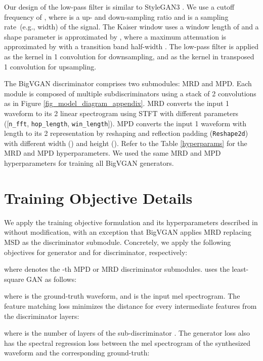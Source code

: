 \documentclass{article} \usepackage{iclr2023_conference,times}
\theoremstyle{plain}
\theoremstyle{definition}
\theoremstyle{remark}
\begin{document}
Our design of the low-pass filter is similar to StyleGAN3 \citep{karras2021alias}. We use a cutoff frequency of , where  is a up- and down-sampling ratio and  is a sampling rate~(e.g., width) of the signal. The Kaiser window uses a window length of  and a shape parameter  is approximated by , where a maximum attenuation  is approximated by  \citep{dsp} with a transition band half-width . The low-pass filter is applied as the kernel in 1 convolution for downsampling, and as the kernel in transposed 1 convolution for upsampling.


The BigVGAN discriminator comprises two submodules: MRD and MPD. Each module is composed of multiple subdiscriminators using a stack of 2 convolutions as in Figure \ref{fig_model_diagram_appendix}. MRD converts the input 1 waveform to its 2 linear spectrogram using STFT with different parameters ([\texttt{n\_fft}, \texttt{hop\_length}, \texttt{win\_length}]). MPD converts the input 1 waveform with length  to its 2 representation by reshaping and reflection padding (\texttt{Reshape2d}) with different width () and height (). Refer to the Table \ref{hyperparams} for the MRD and MPD hyperparameters. We used the same MRD and MPD hyperparameters for training all BigVGAN generators.




\section{Training Objective Details}
\label{appendix:loss_detail}
We apply the training objective formulation and its hyperparameters described in \citep{kong2020hifi} without modification, with an exception that BigVGAN applies MRD replacing MSD as the discriminator submodule. Concretely, we apply the following objectives  for generator and  for discriminator, respectively:
\vspace{-0.3em}

where  denotes the -th MPD or MRD discriminator submodules.  uses the least-square GAN \citep{mao2017least} as follows:
\vspace{-0.3em}

where  is the ground-truth waveform, and  is the input mel spectrogram. The feature matching loss  \citep{larsen2016autoencoding, kumar2019melgan} minimizes the  distance for every intermediate features from the discriminator layers:
\vspace{-0.3em}

where  is the number of layers of the sub-discriminator . The generator loss  also has the spectral  regression loss between the mel spectrogram of the synthesized waveform and the corresponding ground-truth:
\vspace{-0.3em}
\end{document}
